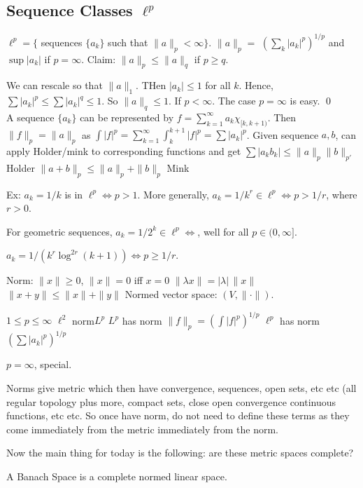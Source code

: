 \subsection{Sequence Classes $\ell^p$}

$\ell^p= \{$ sequences $\{a_k\}$ such that $\|a\|_p<\infty\}$. $\|a\|_p=$ $(\sum_k |a_k|^p)^{1/p}$ and $\sup |a_k|$ if $p=\infty$. Claim: $\|a\|_p \leq \|a\|_q$ if $p \geq q$.  

\pf We can rescale so that $\|a\|_1$. THen $|a_k| \leq 1$ for all $k$. Hence, $\sum |a_k|^p \leq \sum |a_k|^q \leq 1$. So $\|a\|_q \leq 1$. If $p<\infty$. The case $p=\infty$ is easy. \qed \\

A sequence $\{a_k\}$ can be represented by $f= \sum_{k=1}^\infty a_k \chi_{[k,k+1)}$. Then $\|f\|_p= \|a\|_p$ as $\int |f|^p= \sum_{k=1}^\infty \int_k^{k+1} |f|^p = \sum |a_k|^p$. Given sequence $a,b$, can apply Holder/mink to corresponding functions and get 
$\sum |a_kb_k| \leq \|a\|_p \|b\|_{p'}$ Holder
$\|a+b\|_p \leq \|a\|_p + \|b\|_p$ Mink

Ex: $a_k=1/k$ is in $\ell^p \iff p>1$. More generally, $a_k= 1/k^r \in \ell^p \iff p>1/r$, where $r>0$.

For geometric sequences, $a_k= 1/2^k \in \ell^p \iff $, well for all $p \in (0,\infty]$. 

$a_k= 1/(k^r \log^{2r}(k+1)) \iff p \geq 1/r$. 



Norm: $\|x\| \geq 0$, $\|x\|=0$ iff $x=0$
$\| \lambda x\|= |\lambda| \, \|x\|$
$\|x+y\| \leq \|x\|+\|y\|$
Normed vector space: $(V, \|\cdot\|)$. 

$1 \leq p \leq \infty$
$\ell^2$ norm$L^p$ 
$L^p$ has norm $\|f\|_p= \left(\int |f|^p \right)^{1/p}$
$\ell^p$ has norm $\left( \sum |a_k|^p \right)^{1/p}$

$p=\infty$, special.


Norms give metric which then have convergence, sequences, open sets, etc etc (all regular topology plus more, compact sets, close open convergence continuous functions, etc etc. So once have norm, do not need to define these terms as they come immediately from the metric immediately from the norm. 

Now the main thing for today is the following: are these metric spaces complete?

\begin{dfn}
A Banach Space is a complete normed linear space.
\end{dfn}

